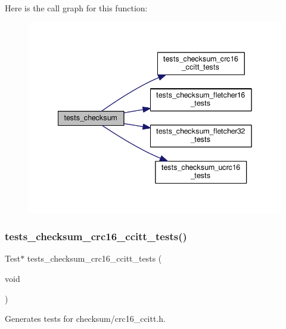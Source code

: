 Here is the call graph for this function\+:
\nopagebreak
\begin{figure}[H]
\begin{center}
\leavevmode
\includegraphics[width=342pt]{group__unittests_gae22a9f38219373678e7c27dbc0011406_cgraph}
\end{center}
\end{figure}
\mbox{\label{group__unittests_gab14760f94862d361e37621a414849ac6}} 
\subsubsection{\texorpdfstring{tests\+\_\+checksum\+\_\+crc16\+\_\+ccitt\+\_\+tests()}{tests\_checksum\_crc16\_ccitt\_tests()}}
{\footnotesize\ttfamily Test$\ast$ tests\+\_\+checksum\+\_\+crc16\+\_\+ccitt\+\_\+tests (\begin{DoxyParamCaption}\item[{void}]{ }\end{DoxyParamCaption})}



Generates tests for checksum/crc16\+\_\+ccitt.\+h. 

